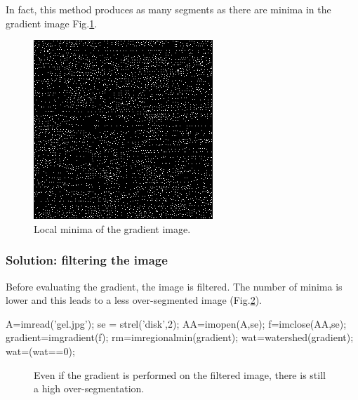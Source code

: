 In fact, this method produces as many segments as there are minima in the gradient image Fig.\ref{fig:watershed:matlab:minima}.
\begin{figure}[htbp]
\centering
\includegraphics[width=.3\linewidth]{minima_gradient.png}
\caption{Local minima of the gradient image.}
 \label{fig:watershed:matlab:minima}
\end{figure}

\subsubsection{Solution: filtering the image}
Before evaluating the gradient, the image is filtered. The number of minima is lower and this leads to a less over-segmented image (Fig.\ref{fig:watershed:matlab:wat_filtered}).
\begin{matlab}
A=imread('gel.jpg');
se = strel('disk',2);
AA=imopen(A,se);
f=imclose(AA,se);
gradient=imgradient(f);
rm=imregionalmin(gradient);
wat=watershed(gradient);
wat=(wat==0);
\end{matlab}

\begin{figure}[htbp]
 \centering
 \hspace{1cm}
 \caption{Even if the gradient is performed on the filtered image, there is still a high over-segmentation.}
 \label{fig:watershed:matlab:wat_filtered}
\end{figure}

